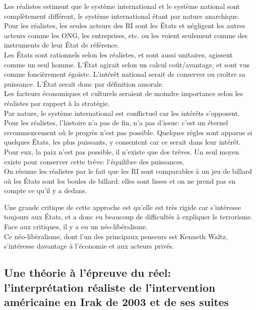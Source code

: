 \documentclass[10pt, a4paper, openany]{book}
\begin{document}
Les réalistes estiment que le système international et le système national sont complètement différent, le système international étant par nature anarchique. \\
Pour les réalistes, les seules acteurs des RI sont les États et négligent les autres acteurs comme les ONG, les entreprises, etc. ou les voient seulement comme des instruments de leur État de référence. \\
Les États sont rationnels selon les réalistes, et sont aussi unitaires, agissent comme un seul homme. L'État agirait selon un calcul coût/avantage, et sont vus comme foncièrement égoïste. L'intérêt national serait de conserver ou croître sa puissance. L'État serait donc par définition amorale. \\
Les facteurs économiques et culturels seraient de moindre importance selon les réalistes par rapport à la stratégie. \\
Par nature, le système international est conflictuel car les intérêts s'opposent. \\
Pour les réalistes, l'histoire n'a pas de fin, n'a pas d'issue: c'est un éternel recommencement où le progrès n'est pas possible. Quelques règles sont apparus si quelques États, les plus puissants, y consentent car ce serait dans leur intérêt. \\
Pour eux, la paix n'est pas possible, il n'existe que des trêves. Un seul moyen existe pour conserver cette trêve: l'équilibre des puissances. \\
On résume les réalistes par le fait que les RI sont comparables à un jeu de billard où les États sont les boules de billard: elles sont lisses et on ne prend pas en compte ce qu'il y a dedans. 


Une grande critique de cette approche est qu'elle est très rigide car s'intéresse toujours aux États, et a donc eu beaucoup de difficultés à expliquer le terrorisme. Face aux critiques, il y a eu un néo-libéralisme. \\
Ce néo-libéralisme, dont l'un des principaux penseurs est Kenneth Waltz, s'intéresse davantage à l'économie et aux acteurs privés. 

\subsection{Une théorie à l'épreuve du réel: l'interprétation réaliste de l'intervention américaine en Irak de 2003 et de ses suites}
\end{document}

